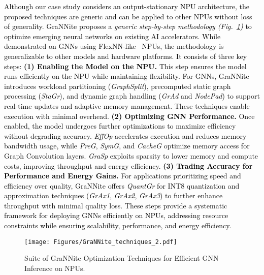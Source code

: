 \textcolor{black}{Although our case study considers an output-stationary NPU architecture, the proposed techniques are generic and can be applied to other NPUs without loss of generality.}
\textcolor{black}{
GraNNite proposes a \textit{generic step-by-step methodology (Fig.~\ref{fig:GraNNite_tech})} to optimize emerging neural networks on existing AI accelerators. While demonstrated on GNNs using FlexNN-like~\cite{flexnn} NPUs, the methodology is generalizable to other models and hardware platforms. It consists of three key steps:
\textbf{(1) Enabling the Model on the NPU.}
This step ensures the model runs efficiently on the NPU while maintaining flexibility. For GNNs, GraNNite introduces workload partitioning (\textit{GraphSplit}), precomputed static graph processing (\textit{StaGr}), and dynamic graph handling (\textit{GrAd} and \textit{NodePad}) to support real-time updates and adaptive memory management. These techniques enable execution with minimal overhead.
\textbf{(2) Optimizing GNN Performance.}
Once enabled, the model undergoes further optimizations to maximize efficiency without degrading accuracy. \textit{EffOp} accelerates execution and reduces memory bandwidth usage, while \textit{PreG}, \textit{SymG}, and \textit{CacheG} optimize memory access for Graph Convolution layers. \textit{GraSp} exploits sparsity to lower memory and compute costs, improving throughput and energy efficiency.
\textbf{(3) Trading Accuracy for Performance and Energy Gains.}
For applications prioritizing speed and efficiency over quality, GraNNite offers \textit{QuantGr} for INT8 quantization and approximation techniques (\textit{GrAx1}, \textit{GrAx2}, \textit{GrAx3}) to further enhance throughput with minimal quality loss.
These steps provide a systematic framework for deploying GNNs efficiently on NPUs, addressing resource constraints while ensuring scalability, performance, and energy efficiency.
}


\begin{figure}[t!]
\begin{center}
\texttt{[image: Figures/GraNNite\_techniques\_2.pdf]}%
\end{center}
\caption{Suite of GraNNite Optimization Techniques for Efficient GNN Inference on NPUs.}\label{fig:GraNNite_tech}
\end{figure}


